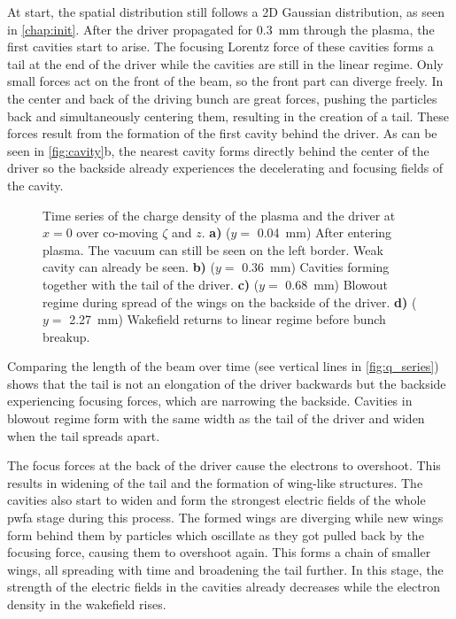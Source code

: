 \documentclass[bachelor_thesis]{subfiles}
\begin{document}
At start, the spatial distribution still follows a 2D Gaussian distribution, as seen in \autoref{chap:init}. After the driver propagated for \qty{0.3}{mm} through the plasma, the first cavities start to arise. The focusing Lorentz force of these cavities forms a tail at the end of the driver while the cavities are still in the linear regime.
Only small forces act on the front of the beam, so the front part can diverge freely. In the center and back of the driving bunch are great forces, pushing the particles back and simultaneously centering them, resulting in the creation of a tail.
These forces result from the formation of the first cavity behind the driver. As can be seen in \autoref{fig:cavity}b, the nearest cavity forms directly behind the center of the driver so the backside already experiences the decelerating and focusing fields of the cavity.
\begin{figure}
	\centering
	
	\caption{Time series of the charge density of the plasma and the driver at $x=0$ over co-moving $\zeta$ and $z$.
	\textbf{a)} ($y=$ \qty{0.04}{mm}) After entering plasma. The vacuum can still be seen on the left border. Weak cavity can already be seen.
	\textbf{b)} ($y=$ \qty{0.36}{mm}) Cavities forming together with the tail of the driver.
	\textbf{c)} ($y=$ \qty{0.68}{mm}) Blowout regime during spread of the wings on the backside of the driver.
	\textbf{d)} ($y=$ \qty{2.27}{mm}) Wakefield returns to linear regime before bunch breakup.}
	\label{fig:cavity}
\end{figure}
Comparing the length of the beam over time (see vertical lines in \autoref{fig:q_series}) shows that the tail is not an elongation of the driver backwards but the backside experiencing focusing forces, which are narrowing the backside.
Cavities in blowout regime form with the same width as the tail of the driver and widen when the tail spreads apart.

The focus forces at the back of the driver cause the electrons to overshoot. This results in widening of the tail and the formation of wing-like structures. The cavities also start to widen and form the strongest electric fields of the whole \gls{pwfa} stage during this process.
The formed wings are diverging while new wings form behind them by particles which oscillate as they got pulled back by the focusing force, causing them to overshoot again. This forms a chain of smaller wings, all spreading with time and broadening the tail further.
In this stage, the strength of the electric fields in the cavities already decreases while the electron density in the wakefield rises.
\end{document}
